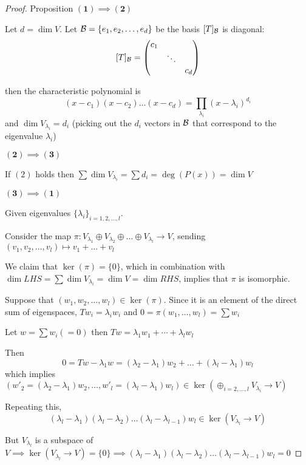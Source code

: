 \begin{proof} {Proposition}
    \(\mathbf{(1) \implies (2)}\)

    Let \(d = \dim V\). Let \(\mathcal{B} = \{e_1, e_2, \dots, e_d\}\) be the basis \st \([T]_{\mathcal{B}}\) is diagonal: \[
        [T]_{\mathcal{B}} = \begin{pmatrix}
            c_1 &        &     \\
                & \ddots &     \\
                &        & c_d
        \end{pmatrix}
    \]

    then the characteristic polynomial is \[
        (x-c_1)(x-c_2) \dots (x-c_d) = \prod_{\lambda_i} (x - \lambda_i)^{d_i}
    \]
    and \(\dim V_{\lambda_i} = d_i\) (picking out the \(d_i\) vectors in \(\mathcal{B}\) that correspond to the eigenvalue \(\lambda_i\))

    \(\mathbf{(2) \implies (3)}\)

    If \((2)\) holds then \(\sum \dim V_{\lambda_i} = \sum d_i = \deg (P(x)) = \dim V\)

    \(\mathbf{(3) \implies (1)}\)

    Given eigenvalues \(\{\lambda_i\}_{i = 1, 2, \dots, l}\).

    Consider the map \(\pi: V_{\lambda_1} \oplus V_{\lambda_2} \oplus \dots \oplus V_{\lambda_l} \to V\), sending \((v_1, v_2, \dots, v_l) \mapsto v_1 + \dots + v_l\)

    We claim that \(\ker(\pi) = \{0\}\), which in combination with \(\dim LHS = \sum \dim V_{\lambda_i} = \dim V = \dim RHS\), implies that \(\pi\) is isomorphic.

    Suppose that \((w_1, w_2, \dots, w_l) \in \ker(\pi)\). Since it is an element of the direct sum of eigenspaces, \(Tw_i = \lambda_i w_i\) and \(0 = \pi(w_1, \dots, w_l) = \sum w_i  \)

    Let \(w = \sum w_i (=0)\) then \(T w = \lambda_1 w_1 + \cdots + \lambda_l w_l\)

    Then \[
        0 = Tw - \lambda_1 w = (\lambda_2 - \lambda_1) w_2 + \dots + (\lambda_l - \lambda_1) w_l
    \]
    which implies \((w'_2  = (\lambda_2 - \lambda_1) w_2, \dots , w'_l = (\lambda_l - \lambda_1) w_l ) \in \ker(\oplus_{i=2, \dots, l} V_{\lambda_i} \to V)\)

    Repeating this, \[
        (\lambda_l - \lambda_1)(\lambda_l - \lambda_2) \dots (\lambda_l - \lambda_{l-1}) w_l \in \ker (V_{\lambda_l} \to V)
    \]

    But \(V_{\lambda_l}\)    is a subspace of \(V \implies \ker(V_{\lambda_l}\to V )= \{0\} \implies (\lambda_l - \lambda_1)(\lambda_l - \lambda_2) \dots (\lambda_l - \lambda_{l-1}) w_l = 0\)


\end{proof}
